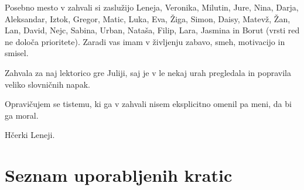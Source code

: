 \documentclass[a4paper, 12pt]{book}
\newcommand{\clearemptydoublepage}{\newpage{\pagestyle{empty}\cleardoublepage}}
\begin{document}
Posebno mesto v zahvali si zaslužijo Leneja, Veronika, Milutin, Jure, Nina, Darja, Aleksandar, Iztok, Gregor, Matic, Luka, Eva, Žiga, Simon, Daisy, Matevž, Žan, Lan, David, Nejc, Sabina, Urban, Nataša, Filip, Lara, Jasmina in Borut (vrsti red ne določa prioritete). Zaradi vas imam v življenju zabavo, smeh, motivacijo in smisel.

Zahvala za naj lektorico gre Juliji, saj je v le nekaj urah pregledala in popravila veliko slovničnih napak.

Opravičujem se tistemu, ki ga v zahvali nisem eksplicitno omenil pa meni, da bi ga moral.
\rm\normalfont

\clearemptydoublepage

\thispagestyle{empty}\mbox{}{\textheight}\mbox{}\hfill\begin{minipage}{0.55\textwidth}%
Hčerki Leneji.
\normalfont\end{minipage}

\clearemptydoublepage

\def\thepage{}%
\tableofcontents{}


\clearemptydoublepage


\chapter*{Seznam uporabljenih kratic}
\end{document}
